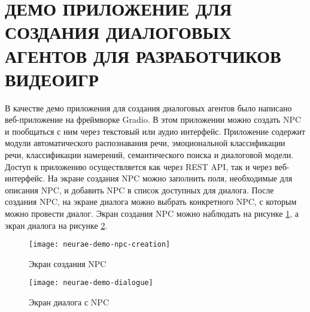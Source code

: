 \section{ДЕМО ПРИЛОЖЕНИЕ ДЛЯ СОЗДАНИЯ ДИАЛОГОВЫХ АГЕНТОВ ДЛЯ РАЗРАБОТЧИКОВ ВИДЕОИГР}
В качестве демо приложения для создания диалоговых агентов было написано веб-приложение на фреймворке Gradio. В этом приложении можно создать NPC и пообщаться с ним через текстовый или аудио интерфейс. Приложение содержит модули автоматического распознавания речи, эмоциональной классификации речи, классификации намерений, семантического поиска и диалоговой модели. Доступ к приложению осуществляется как через REST API, так и через веб-интерфейс. На экране создания NPC можно заполнить поля, необходимые для описания NPC, и добавить NPC в список доступных для диалога. После создания NPC, на экране диалога можно выбрать конкретного NPC, с которым можно провести диалог. Экран создания NPC можно наблюдать на рисунке \ref{demo-npc-creation}, а экран диалога на рисунке \ref{demo-dialogue}.
\begin{figure}[H]
    \centering
    \texttt{[image: neurae-demo-npc-creation]}
    \caption{Экран создания NPC}
    \label{demo-npc-creation}
\end{figure}
\begin{figure}[H]
    \centering
    \texttt{[image: neurae-demo-dialogue]}
    \caption{Экран диалога с NPC}
    \label{demo-dialogue}
\end{figure}
